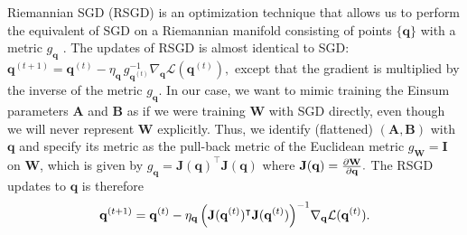 \documentclass{article}
\newcommand{\mbf}[1]{{\boldsymbol{\mathbf{#1}}}}
\newcommand{\bm}{\mbf}
\begin{document}
Riemannian SGD (RSGD) is an optimization technique that allows us to perform the equivalent of SGD on a Riemannian manifold consisting of points $\{\bm{q}\}$ with a metric $g_\bm{q}$ \citep{bonnabel2011rsgd}.
The updates of RSGD is almost identical to SGD: $\bm{q}^{(t+1)} = \bm{q}^{(t)} - \eta_{\bm{q}} \, g_{\bm{q}^{(t)}}^{-1} \nabla_{\bm{q}}\mathcal{L}(\bm{q}^{(t)}),$
except that the gradient is multiplied by the inverse of the metric $g_{\bm{q}}$.
In our case, we want to mimic training the Einsum parameters $\bm{A}$ and $\bm{B}$ as if we were training $\bm{W}$ with SGD directly, even though we will never represent $\bm{W}$ explicitly. Thus, we identify (flattened) $(\bm{A}, \bm{B})$ with $\bm{q}$ and specify its metric as the pull-back metric of the Euclidean metric $g_{\bm{W}} = \bm{I}$ on $\bm{W}$, which is given by $g_{\bm{q}} = \bm{J}(\bm{q})^{\intercal} \bm{J}(\bm{q})$ where $\bm{J}(\bm{q}) = \pdv{\bm{W}}{\bm{q}}.$ The RSGD updates to $\bm{q}$ is therefore
\begin{equation*}
    \begin{split}
      \bm{q}^{(t+1)}
      =
      \bm{q}^{(t)}
      - \eta_{\bm{q}} \,
      \qty(\bm{J}(\bm{q}^{(t)})^{\intercal} \bm{J}(\bm{q}^{(t)}))^{-1} \nabla_{\bm{q}}\mathcal{L}(\bm{q}^{(t)}).
    \end{split}
\end{equation*}
\end{document}
